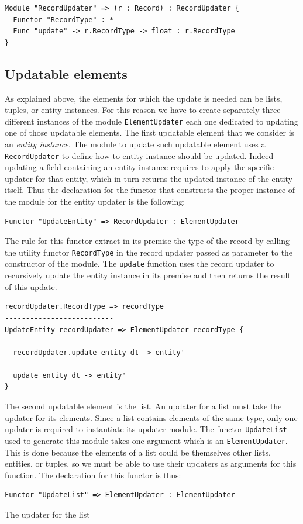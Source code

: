 \begin{lstlisting}
Module "RecordUpdater" => (r : Record) : RecordUpdater {
  Functor "RecordType" : *
  Func "update" -> r.RecordType -> float : r.RecordType
}
\end{lstlisting}

\subsection{Updatable elements}
\label{subsec:ch_networking_updatable_elements}
As explained above, the elements for which the update is needed can be lists, tuples, or entity instances. For this reason we have to create separately three different instances of the module \texttt{ElementUpdater} each one dedicated to updating one of those updatable elements. The first updatable element that we consider is an \textit{entity instance}. The module to update such updatable element uses a \texttt{RecordUpdater} to define how to entity instance should be updated. Indeed updating a field containing an entity instance requires to apply the specific updater for that entity, which in turn returns the updated instance of the entity itself. Thus the declaration for the functor that constructs the proper instance of the module for the entity updater is the following:

\begin{lstlisting}
Functor "UpdateEntity" => RecordUpdater : ElementUpdater
\end{lstlisting}

\noindent
The rule for this functor extract in its premise the type of the record by calling the utility functor \texttt{RecordType} in the record updater passed as parameter to the constructor of the module. The \texttt{update} function uses the record updater to recursively update the entity instance in its premise and then returns the result of this update.

\begin{lstlisting}
recordUpdater.RecordType => recordType
--------------------------
UpdateEntity recordUpdater => ElementUpdater recordType {
 
  recordUpdater.update entity dt -> entity'
  ------------------------------
  update entity dt -> entity'
}
\end{lstlisting}

\noindent
The second updatable element is the list. An updater for a list must take the updater for its elements. Since a list contains elements of the same type, only one updater is required to instantiate its updater module. The functor \texttt{UpdateList} used to generate this module takes one argument which is an \texttt{ElementUpdater}. This is done because the elements of a list could be themselves other lists, entities, or tuples, so we must be able to use their updaters as arguments for this function. The declaration for this functor is thus:

\begin{lstlisting}
Functor "UpdateList" => ElementUpdater : ElementUpdater
\end{lstlisting}

\noindent
The updater for the list 